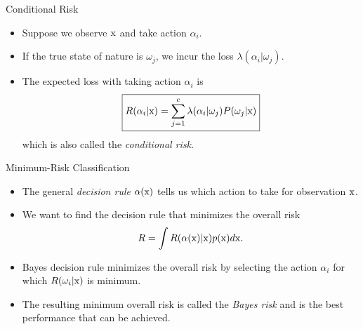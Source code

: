 \begin{frame}{Conditional Risk}
\begin{itemize}
\setlength{\itemsep}{4pt}
\item Suppose we observe ${\rm x}$ and take action $\alpha_i$.
\item If the true state of nature is $\omega_j$, we incur the loss $\lambda(\alpha_i|\omega_j)$.
\item The expected loss with taking action $\alpha_i$ is
\[\boxed{R(\alpha_i|{\rm x})=\sum_{j=1}^{c}\lambda(\alpha_i|\omega_j)P(\omega_j|{\rm x})}\]
which is also called the \textit{\color{mycolor1}conditional risk}.
\end{itemize}
\end{frame}

\begin{frame}{Minimum-Risk Classification}
\begin{itemize}
\setlength{\itemsep}{4pt}
\item The general \textit{\color{mycolor2}decision rule} $\alpha({\rm x})$ tells us which action to take for observation ${\rm x}$.
\item We want to find the decision rule that minimizes the overall risk
\[R=\int R(\alpha({\rm x})|{\rm x})p({\rm x})d{\rm x}.\]
\item Bayes decision rule minimizes the overall risk by selecting the action $\alpha_i$ for which $R(\omega_i|{\rm x})$ is {\color{mycolor2}minimum}.
\item The resulting minimum overall risk is called the \textit{\color{mycolor2}Bayes risk} and is the best performance that can be achieved.
\end{itemize}
\end{frame}


